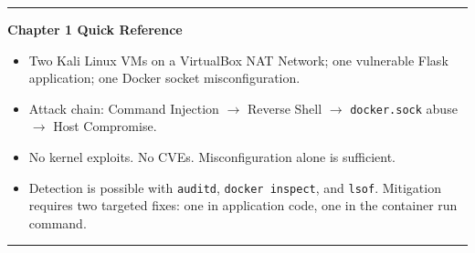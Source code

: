 
\vspace{1em}
\noindent\rule{\textwidth}{0.4pt}
\vspace{0.5em}

\noindent\textbf{Chapter 1 Quick Reference}

\begin{itemize}
  \item Two Kali Linux VMs on a VirtualBox NAT Network; one vulnerable Flask
    application; one Docker socket misconfiguration.
  \item Attack chain: Command Injection $\rightarrow$ Reverse Shell
    $\rightarrow$ \texttt{docker.sock} abuse $\rightarrow$ Host Compromise.
  \item No kernel exploits. No CVEs. Misconfiguration alone is sufficient.
  \item Detection is possible with \texttt{auditd}, \texttt{docker inspect}, and
    \texttt{lsof}. Mitigation requires two targeted fixes: one in application
    code, one in the container run command.
\end{itemize}

\noindent\rule{\textwidth}{0.4pt}